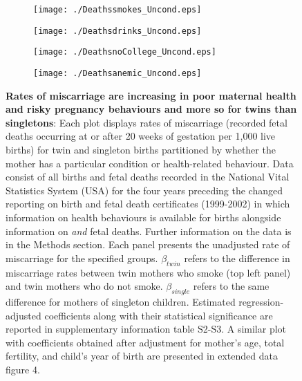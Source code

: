 \documentclass{nature}
\begin{document}
\begin{linenumbers}
\begin{spacing}{1}
\begin{figure}[htpb!]
\begin{subfigure}{.5\textwidth}
  \texttt{[image: ./Deathssmokes\_Uncond.eps]}
\end{subfigure}%
\begin{subfigure}{.5\textwidth}
  \texttt{[image: ./Deathsdrinks\_Uncond.eps]}
\end{subfigure}
\begin{subfigure}{.5\textwidth}
  \texttt{[image: ./DeathsnoCollege\_Uncond.eps]}
\end{subfigure}%
\begin{subfigure}{.5\textwidth}
  \texttt{[image: ./Deathsanemic\_Uncond.eps]}
\end{subfigure}
\vspace{5mm}
\caption{\textbf{Rates of miscarriage are increasing in poor maternal health and risky pregnancy behaviours and more so for twins than singletons}: {\footnotesize Each plot displays rates of miscarriage (recorded fetal deaths occurring at or after 20 weeks of gestation per 1,000 live births) for twin and singleton births partitioned by whether the mother has a particular condition or health-related behaviour. Data consist of all births and fetal deaths recorded in the National Vital Statistics System (USA) for the four years preceding the changed reporting on birth and fetal death certificates (1999-2002) in which information on health behaviours is available for births alongside information on \emph{and} fetal deaths. Further information on the data is in the Methods section. Each panel presents the unadjusted rate of miscarriage for the specified groups. $\beta_{twin}$ refers to the difference in miscarriage rates between twin mothers who smoke (top left panel) and twin mothers who do not smoke. $\beta_{single}$ refers to the same difference for mothers of singleton children. Estimated regression-adjusted coefficients along with their statistical significance are reported in supplementary information table S2-S3. A similar plot with coefficients obtained after adjustment for mother's age, total fertility, and child's year of birth are presented in extended data figure 4.}}
\label{fig:mech}
\end{figure}
\end{spacing}



\end{linenumbers}
\end{document}
